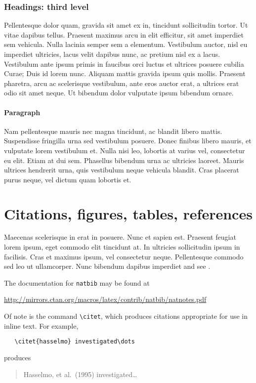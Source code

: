 \documentclass{article}
\begin{document}
\subsubsection{Headings: third level}

Pellentesque dolor quam, gravida sit amet ex in, tincidunt sollicitudin tortor. Ut vitae dapibus tellus. Praesent maximus arcu in elit efficitur, sit amet imperdiet sem vehicula. Nulla lacinia semper sem a elementum. Vestibulum auctor, nisl eu imperdiet ultricies, lacus velit dapibus nunc, ac pretium nisl ex a lacus. Vestibulum ante ipsum primis in faucibus orci luctus et ultrices posuere cubilia Curae; Duis id lorem nunc. Aliquam mattis gravida ipsum quis mollis. Praesent pharetra, arcu ac scelerisque vestibulum, ante eros auctor erat, a ultrices erat odio sit amet neque. Ut bibendum dolor vulputate ipsum bibendum ornare.

\paragraph{Paragraph}
Nam pellentesque mauris nec magna tincidunt, ac blandit libero mattis. Suspendisse fringilla urna sed vestibulum posuere. Donec finibus libero mauris, et vulputate lorem vestibulum et. Nulla nisi leo, lobortis at varius vel, consectetur eu elit. Etiam at dui sem. Phasellus bibendum urna ac ultricies laoreet. Mauris ultrices hendrerit urna, quis vestibulum neque vehicula blandit. Cras placerat purus neque, vel dictum quam lobortis et.

\section{Citations, figures, tables, references}
\label{others}

Maecenas scelerisque in erat in posuere. Nunc et sapien est. Praesent feugiat lorem ipsum, eget commodo elit tincidunt at. In ultricies sollicitudin ipsum in facilisis. Cras et maximus ipsum, vel consectetur neque. Pellentesque commodo sed leo ut ullamcorper. Nunc bibendum dapibus imperdiet \cite{kour2014rea,kour2014fast} and see \cite{hadash2018estimate}.


The documentation for \verb+natbib+ may be found at
\begin{center}
  \url{http://mirrors.ctan.org/macros/latex/contrib/natbib/natnotes.pdf}
\end{center}
Of note is the command \verb+\citet+, which produces citations
appropriate for use in inline text.  For example,
\begin{verbatim}
   \citet{hasselmo} investigated\dots
\end{verbatim}
produces
\begin{quote}
  Hasselmo, et al.\ (1995) investigated\dots
\end{quote}
\end{document}
